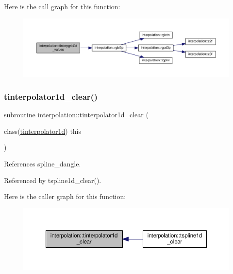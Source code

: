 Here is the call graph for this function\+:
\nopagebreak
\begin{figure}[H]
\begin{center}
\leavevmode
\includegraphics[width=350pt]{namespaceinterpolation_ad36dce10ba7587405b8862f7bea68d33_cgraph}
\end{center}
\end{figure}
\mbox{\label{namespaceinterpolation_a3842ef3937aaef204100599321d0b91f}} 
\subsubsection{\texorpdfstring{tinterpolator1d\+\_\+clear()}{tinterpolator1d\_clear()}}
{\footnotesize\ttfamily subroutine interpolation\+::tinterpolator1d\+\_\+clear (\begin{DoxyParamCaption}\item[{class(\mbox{\hyperlink{structinterpolation_1_1tinterpolator1d}{tinterpolator1d}})}]{this }\end{DoxyParamCaption})}



References spline\+\_\+dangle.



Referenced by tspline1d\+\_\+clear().

Here is the caller graph for this function\+:
\nopagebreak
\begin{figure}[H]
\begin{center}
\leavevmode
\includegraphics[width=350pt]{namespaceinterpolation_a3842ef3937aaef204100599321d0b91f_icgraph}
\end{center}
\end{figure}
\mbox{\label{namespaceinterpolation_abbd84288df284345da697e10533c07a7}} 
